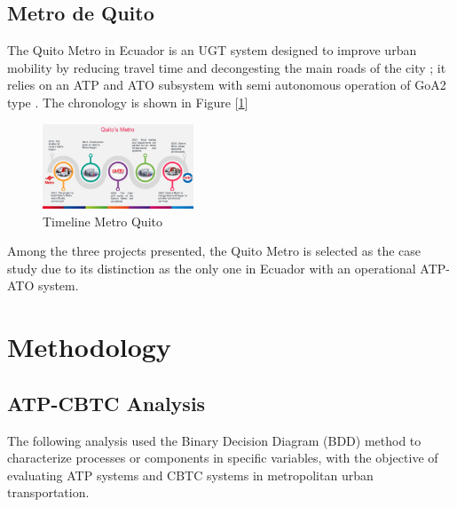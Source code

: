 \documentclass[conference]{IEEEtran}
\begin{document}
\subsection{Metro de Quito}
The Quito Metro in Ecuador is an UGT system designed to improve urban mobility by reducing travel time and decongesting the main roads of the city \cite{b2}; it relies on an ATP and ATO subsystem with semi autonomous operation of GoA2 type \cite{b13}. The chronology is shown in Figure [\ref{Timeline Metro Quito}]
\begin{figure}[htbp]                                     
    \centerline{\includegraphics[width=0.4\textwidth, scale=1]{Imagenes_general/Metro de Quito_en.pdf}}
    \caption{Timeline Metro Quito}                     
    \label{Timeline Metro Quito}                                                 
\end{figure} 

Among the three projects presented, the Quito Metro is selected as the case study due to its distinction as the only one in Ecuador with an operational ATP-ATO system.


\section{Methodology}

\subsection{ATP-CBTC Analysis}
The following analysis used the Binary Decision Diagram (BDD) \cite{b6} method to characterize processes or components in specific variables, with the objective of evaluating ATP systems and CBTC systems in metropolitan urban transportation. \\
\end{document}

